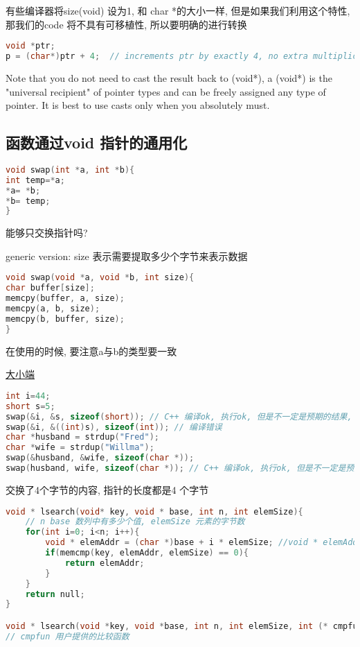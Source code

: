 \documentclass{article}
\begin{document}
有些编译器将size(void) 设为1, 和 char *的大小一样, 但是如果我们利用这个特性, 那我们的code 将不具有可移植性, 所以要明确的进行转换

\begin{lstlisting}[language = C]
void *ptr;
p = (char*)ptr + 4;  // increments ptr by exactly 4, no extra multiplication
\end{lstlisting}
Note that you do not need to cast the result back to (void*), a (void*) is the "universal
recipient" of pointer types and can be freely assigned any type of pointer.  It is best to
use casts only when you absolutely must.

\subsection{函数通过void 指针的通用化}
\begin{lstlisting}[language = C]
void swap(int *a, int *b){
int temp=*a;
*a= *b;
*b= temp;
}
\end{lstlisting}
能够只交换指针吗?

generic version: size 表示需要提取多少个字节来表示数据
\begin{lstlisting}[language = C]
void swap(void *a, void *b, int size){
char buffer[size];
memcpy(buffer, a, size);
memcpy(a, b, size);
memcpy(b, buffer, size);
}
\end{lstlisting}
在使用的时候, 要注意a与b的类型要一致

\href{https://www.cnblogs.com/wuyuegb2312/archive/2013/06/08/3126510.html}{大小端}
\begin{lstlisting}[language = C]
int i=44;
short s=5;
swap(&i, &s, sizeof(short)); // C++ 编译ok, 执行ok, 但是不一定是预期的结果, 取决于i 的大小和大小端
swap(&i, &((int)s), sizeof(int)); // 编译错误
char *husband = strdup("Fred");
char *wife = strdup("Willma");
swap(&husband, &wife, sizeof(char *));
swap(husband, wife, sizeof(char *)); // C++ 编译ok, 执行ok, 但是不一定是预期的结果
\end{lstlisting}
交换了4个字节的内容, 指针的长度都是4 个字节

\begin{lstlisting}[language = C]
void * lsearch(void* key, void * base, int n, int elemSize){
	// n base 数列中有多少个值, elemSize 元素的字节数
	for(int i=0; i<n; i++){
		void * elemAddr = (char *)base + i * elemSize; //void * elemAddr = base + i * elemSize; error 不同类型的数据指针加1 的偏移量不一样
		if(memcmp(key, elemAddr, elemSize) == 0){
			return elemAddr;
		}
	}
	return null;
}

void * lsearch(void *key, void *base, int n, int elemSize, int (* cmpfun)(void *, void *))
// cmpfun 用户提供的比较函数
\end{lstlisting}
\end{document}
